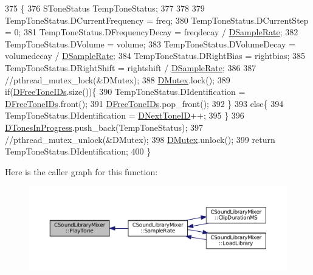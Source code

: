 \begin{DoxyCode}
375                                                                                                            
                          \{
376     SToneStatus TempToneStatus;
377     
378 
379     TempToneStatus.DCurrentFrequency = freq;
380     TempToneStatus.DCurrentStep = 0;
381     TempToneStatus.DFrequencyDecay = freqdecay / \hyperlink{classCSoundLibraryMixer_af2d94eb0c2b55d92ff00d18a25cbed6a}{DSampleRate};
382     TempToneStatus.DVolume = volume;
383     TempToneStatus.DVolumeDecay = volumedecay / \hyperlink{classCSoundLibraryMixer_af2d94eb0c2b55d92ff00d18a25cbed6a}{DSampleRate};
384     TempToneStatus.DRightBias = rightbias;
385     TempToneStatus.DRightShift = rightshift / \hyperlink{classCSoundLibraryMixer_af2d94eb0c2b55d92ff00d18a25cbed6a}{DSampleRate};
386     
387     \textcolor{comment}{//pthread\_mutex\_lock(&DMutex);}
388     \hyperlink{classCSoundLibraryMixer_a955562a0638df831413a1c6b8860f9fb}{DMutex}.lock();
389     \textcolor{keywordflow}{if}(\hyperlink{classCSoundLibraryMixer_a2d1389368651db10fd6fd8b3cd08c164}{DFreeToneIDs}.size())\{
390         TempToneStatus.DIdentification = \hyperlink{classCSoundLibraryMixer_a2d1389368651db10fd6fd8b3cd08c164}{DFreeToneIDs}.front();
391         \hyperlink{classCSoundLibraryMixer_a2d1389368651db10fd6fd8b3cd08c164}{DFreeToneIDs}.pop\_front();
392     \}
393     \textcolor{keywordflow}{else}\{
394         TempToneStatus.DIdentification = \hyperlink{classCSoundLibraryMixer_a88efc1ea710744bceadccf66967f9736}{DNextToneID}++;    
395     \}
396     \hyperlink{classCSoundLibraryMixer_a39bb9c811d842a282b6b7058ac7dfe1c}{DTonesInProgress}.push\_back(TempToneStatus);
397     \textcolor{comment}{//pthread\_mutex\_unlock(&DMutex);  }
398     \hyperlink{classCSoundLibraryMixer_a955562a0638df831413a1c6b8860f9fb}{DMutex}.unlock();
399     \textcolor{keywordflow}{return} TempToneStatus.DIdentification;
400 \}
\end{DoxyCode}
Here is the caller graph for this function\+:
\nopagebreak
\begin{figure}[H]
\begin{center}
\leavevmode
\includegraphics[width=350pt]{classCSoundLibraryMixer_a48bf99193d92c07a5c5229d58a10d9fe_icgraph}
\end{center}
\end{figure}
\hypertarget{classCSoundLibraryMixer_a03221f151dfe72381da5d0d0539bab94}{}\label{classCSoundLibraryMixer_a03221f151dfe72381da5d0d0539bab94} 
